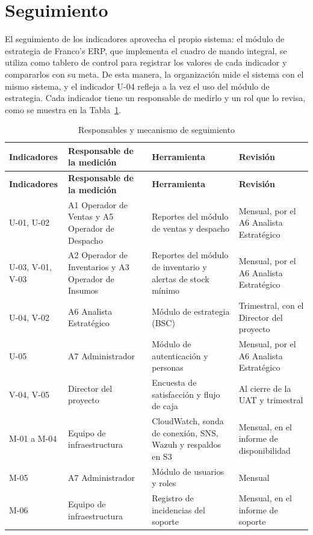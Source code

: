 \section{Seguimiento}


El seguimiento de los indicadores aprovecha el propio sistema: el módulo de estrategia de Franco's ERP, que implementa el cuadro de mando integral, se utiliza como tablero de control para registrar los valores de cada indicador y compararlos con su meta. De esta manera, la organización mide el sistema con el mismo sistema, y el indicador U-04 refleja a la vez el uso del módulo de estrategia. Cada indicador tiene un responsable de medirlo y un rol que lo revisa, como se muestra en la Tabla~\ref{tab:cap5-5}.


{\small
\renewcommand{\arraystretch}{1.3}
\begin{longtable}{|>{\raggedright\arraybackslash}p{1.43cm}|>{\raggedright\arraybackslash}p{4.55cm}|>{\raggedright\arraybackslash}p{5.26cm}|>{\raggedright\arraybackslash}p{3.57cm}|}
\caption{Responsables y mecanismo de seguimiento}\label{tab:cap5-5}\\
\hline
\textbf{Indicadores} & \textbf{Responsable de la medición} & \textbf{Herramienta} & \textbf{Revisión} \\
\hline
\endfirsthead
\hline
\textbf{Indicadores} & \textbf{Responsable de la medición} & \textbf{Herramienta} & \textbf{Revisión} \\
\hline
\endhead
U-01, U-02 & A1 Operador de Ventas y A5 Operador de Despacho & Reportes del módulo de ventas y despacho & Mensual, por el A6 Analista Estratégico \\
\hline
U-03, V-01, V-03 & A2 Operador de Inventarios y A3 Operador de Insumos & Reportes del módulo de inventario y alertas de stock mínimo & Mensual, por el A6 Analista Estratégico \\
\hline
U-04, V-02 & A6 Analista Estratégico & Módulo de estrategia (BSC) & Trimestral, con el Director del proyecto \\
\hline
U-05 & A7 Administrador & Módulo de autenticación y personas & Mensual, por el A6 Analista Estratégico \\
\hline
V-04, V-05 & Director del proyecto & Encuesta de satisfacción y flujo de caja & Al cierre de la UAT y trimestral \\
\hline
M-01 a M-04 & Equipo de infraestructura & CloudWatch, sonda de conexión, SNS, Wazuh y respaldos en S3 & Mensual, en el informe de disponibilidad \\
\hline
M-05 & A7 Administrador & Módulo de usuarios y roles & Mensual \\
\hline
M-06 & Equipo de infraestructura & Registro de incidencias del soporte & Mensual, en el informe de soporte \\
\hline
\end{longtable}
}



